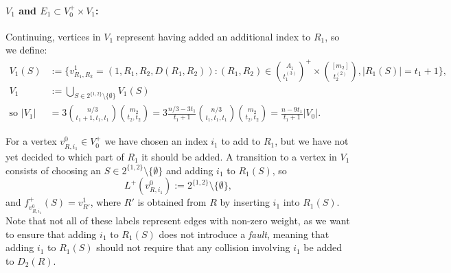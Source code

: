 \documentclass{theoretics}
\renewcommand{\>}{\rangle}
\newcommand{\<}{\langle}
\renewcommand{\(}{\left(}
\renewcommand{\)}{\right)}
\begin{document}
\paragraph{$V_1$ and $E_1\subset V_0^+\times V_1$:} Continuing, vertices in $V_1$ represent having added an additional index to $R_1$, so we define:
\begin{align}
V_1(S) &:=\Bigg\{v^1_{R_1,R_2}=(1,R_1,R_2,D(R_1,R_2)): (R_1,R_2)\in\binom{A_1}{t_1^{(3)}}^+\times \binom{[m_2]}{t_2^{(2)}},|R_1(S)|=t_1+1\Bigg\},\nonumber\\
V_1 &:=\bigcup_{S\in 2^{\{1,2\}}\setminus\{\emptyset\}}V_1(S)\nonumber\\
\mbox{so }|V_1|&=3\binom{n/3}{t_1+1,t_1,t_1}\binom{m_2}{t_2,t_2}
= 3\frac{n/3-3t_1}{t_1+1}\binom{n/3}{t_1,t_1,t_1}\binom{m_2}{t_2,t_2}
= \frac{n-9t_1}{t_1+1}|V_0|.
\label{eq:V3}
\end{align}

For a vertex $v_{R,i_1}^0\in V_0^+$ we have chosen an index $i_1$ to add to $R_1$, but we have not yet decided to which part of $R_1$ it should be added. A transition to a vertex in $V_1$ consists of choosing an $S \in 2^{\{1,2\}} \setminus \{\emptyset\}$ and adding $i_1$ to $R_1(S)$, so
$$L^+(v_{R,i_1}^0):=2^{\{1,2\}} \setminus \{\emptyset\},$$
and $f^+_{v_{R,i_1}^0}(S) = v^1_{R'}$, where $R'$ is obtained from $R$ by inserting $i_1$ into $R_1(S)$. Note that not all of these labels represent edges with non-zero weight, as we want to ensure that adding $i_1$ to $R_1(S)$ does not introduce a \emph{fault}, meaning that adding $i_1$ to $R_1(S)$ should not require that any collision involving $i_1$ be added to $D_2(R)$. 
\end{document}

